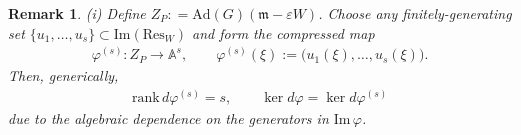 \documentclass[11pt]{amsart}
\theoremstyle{definition}
\theoremstyle{plain}
\newtheorem{remark}[theorem]{Remark}
\theoremstyle{conclusion}
\begin{document}
 \begin{remark}
 \label{rem:dimension}
(i) Define $Z_P : = \mathrm{Ad}(G)(\mathfrak{m} - \varepsilon W)$. Choose any finitely-generating set $\{u_1,\ldots,u_s\}\subset\mathrm{Im}(\mathrm{Res}_W)$ and form the compressed map \begin{align*}
\varphi^{(s)}:Z_{P}\longrightarrow\mathbb{A}^s,\qquad \varphi^{(s)}(\xi):=\bigl(u_1(\xi),\ldots,u_s(\xi)\bigr).
\end{align*} Then, generically, \begin{align*}
\mathrm{rank}\,d\varphi^{(s)}=s,\qquad \ker d\varphi=\ker d\varphi^{(s)} 
\end{align*} due to the algebraic dependence on the generators in $\mathrm{Im}\,\varphi $. %



\end{remark}
\end{document}
